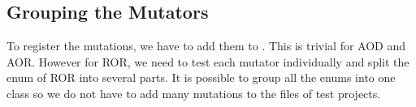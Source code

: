 \subsection{Grouping the Mutators}
To register the mutations, we have to add them to .
This is trivial for AOD and AOR.
However for ROR, we need to test each mutator individually and split the enum of ROR into several parts.
It is possible to group all the enums into one class so we do not have to add many mutations to the  files of test projects.

